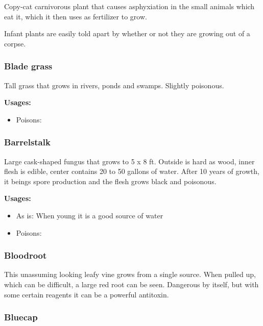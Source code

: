 Copy-cat carnivorous plant that causes asphyxiation in the small animals which eat it, which it then uses as fertilizer to grow.

Infant plants are easily told apart by whether or not they are growing out of a corpse.

\subsubsection{Blade grass}
\label{Blade grass}

Tall grass that grows in rivers, ponds and swamps. Slightly poisonous.

\vspace{5mm}

\textbf{Usages:}

\begin{itemize}[noitemsep]
\item[] Poisons: \poison
\end{itemize}

\subsubsection{Barrelstalk}
\label{Barrelstalk}

Large cask-shaped fungus that grows to 5 x 8 ft. Outside is hard as wood, inner flesh is edible, center contains 20 to 50 gallons of water. After 10 years of growth, it beings spore production and the flesh grows black and poisonous.

\vspace{5mm}

\textbf{Usages:}

\begin{itemize}[noitemsep]
\item[] As is: When young it is a good source of water
\item[] Poisons: \poison
\end{itemize}

\subsubsection{Bloodroot}
\label{bloodroot}

This unassuming looking leafy vine grows from a single source. When pulled up, which can be difficult, a large red root can be seen. Dangerous by itself, but with some certain reagents it can be a powerful antitoxin.

\subsubsection{Bluecap}
\label{Bluecap}

